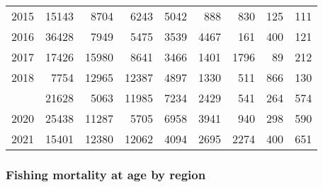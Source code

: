 \documentclass[
]{article}
\begin{document}
\begin{longtable}[t]{lrrrrrrrr}
2015 & 15143 & 8704 & 6243 & 5042 & 888 & 830 & 125 & 111\\
2016 & 36428 & 7949 & 5475 & 3539 & 4467 & 161 & 400 & 121\\
2017 & 17426 & 15980 & 8641 & 3466 & 1401 & 1796 & 89 & 212\\
2018 & 7754 & 12965 & 12387 & 4897 & 1330 & 511 & 866 & 130\\
\addlinespace
2019 & 21628 & 5063 & 11985 & 7234 & 2429 & 541 & 264 & 574\\
2020 & 25438 & 11287 & 5705 & 6958 & 3941 & 940 & 298 & 590\\
2021 & 15401 & 12380 & 12062 & 4094 & 2695 & 2274 & 400 & 651\\*
\end{longtable}

\hypertarget{fishing-mortality-at-age-by-region}{%
\subsubsection{Fishing mortality at age by
region}\label{fishing-mortality-at-age-by-region}}
\end{document}
